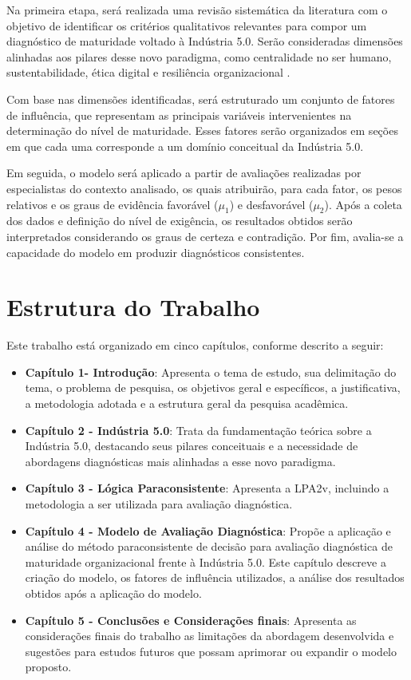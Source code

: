 Na primeira etapa, será realizada uma revisão sistemática da literatura com o objetivo de identificar os critérios qualitativos relevantes para compor um diagnóstico de maturidade voltado à Indústria 5.0.
Serão consideradas dimensões alinhadas aos pilares desse novo paradigma, como centralidade no ser humano, sustentabilidade, ética digital e resiliência organizacional \cite{euCommission2021}.

Com base nas dimensões identificadas, será estruturado um conjunto de fatores de influência, que representam as principais variáveis intervenientes na determinação do nível de maturidade.
Esses fatores serão organizados em seções em que cada uma corresponde a um domínio conceitual da Indústria 5.0. 

Em seguida, o modelo será aplicado a partir de avaliações realizadas por especialistas do contexto analisado, os quais atribuirão, para cada fator, os pesos relativos e os graus de evidência favorável ($\mu_1$) e desfavorável ($\mu_2$).
Após a coleta dos dados e definição do nível de exigência, os resultados obtidos serão interpretados considerando os graus de certeza e contradição. Por fim, avalia-se a capacidade do modelo em produzir diagnósticos consistentes.

\section{Estrutura do Trabalho}

Este trabalho está organizado em cinco capítulos, conforme descrito a seguir:

\begin{itemize}
    \item \textbf{Capítulo 1- Introdução}: Apresenta o tema de estudo, sua delimitação do tema, o problema de pesquisa, os objetivos geral e específicos, a justificativa, a metodologia adotada e a estrutura geral da pesquisa acadêmica.
    
    \item \textbf{Capítulo 2 - Indústria 5.0}: Trata da fundamentação teórica sobre a Indústria 5.0, destacando seus pilares conceituais e a necessidade de abordagens diagnósticas mais alinhadas a esse novo paradigma.
    
    \item \textbf{Capítulo 3 - Lógica Paraconsistente}: Apresenta a \gls{LPA2v}, incluindo a metodologia a ser utilizada para avaliação diagnóstica.
    
    \item \textbf{Capítulo 4 - Modelo de Avaliação Diagnóstica}: Propõe a aplicação e análise do método paraconsistente de decisão para avaliação diagnóstica de maturidade organizacional frente à Indústria 5.0.
    Este capítulo descreve a criação do modelo, os fatores de influência utilizados, a análise dos resultados obtidos após a aplicação do modelo.
    
    \item \textbf{Capítulo 5 - Conclusões e Considerações finais}: Apresenta as considerações finais do trabalho as limitações da abordagem desenvolvida e sugestões para estudos futuros que possam aprimorar ou expandir o modelo proposto.
\end{itemize}

